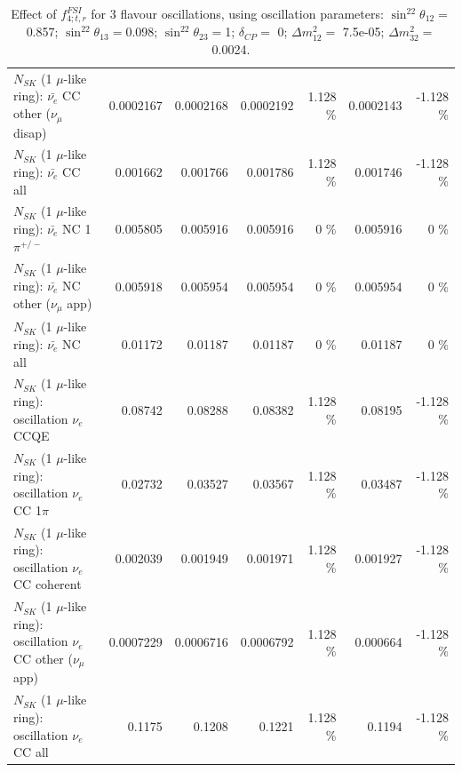 \begin{table}
\begin{tabular}{| l | r | r | r  r | r  r |}
          $N_{SK}$ (1 $\mu$-like ring): $\bar{\nu_e}$ CC other ($\nu_\mu$ disap) &       0.0002167 &       0.0002168 &       0.0002192 &    1.128 \%  &       0.0002143 &   -1.128 \%  \\ 
                            $N_{SK}$ (1 $\mu$-like ring): $\bar{\nu_{e}}$ CC all &        0.001662 &        0.001766 &        0.001786 &    1.128 \%  &        0.001746 &   -1.128 \%  \\ 
\hline
                     $N_{SK}$ (1 $\mu$-like ring): $\bar{\nu_e}$ NC 1$\pi^{+/-}$ &        0.005805 &        0.005916 &        0.005916 &        0 \%  &        0.005916 &        0 \%  \\ 
            $N_{SK}$ (1 $\mu$-like ring): $\bar{\nu_e}$ NC other ($\nu_\mu$ app) &        0.005918 &        0.005954 &        0.005954 &        0 \%  &        0.005954 &        0 \%  \\ 
                            $N_{SK}$ (1 $\mu$-like ring): $\bar{\nu_{e}}$ NC all &         0.01172 &         0.01187 &         0.01187 &        0 \%  &         0.01187 &        0 \%  \\ 
\hline
\hline
\hline
                          $N_{SK}$ (1 $\mu$-like ring): oscillation $\nu_e$ CCQE &         0.08742 &         0.08288 &         0.08382 &    1.128 \%  &         0.08195 &   -1.128 \%  \\ 
                     $N_{SK}$ (1 $\mu$-like ring): oscillation $\nu_e$ CC 1$\pi$ &         0.02732 &         0.03527 &         0.03567 &    1.128 \%  &         0.03487 &   -1.128 \%  \\ 
                   $N_{SK}$ (1 $\mu$-like ring): oscillation $\nu_e$ CC coherent &        0.002039 &        0.001949 &        0.001971 &    1.128 \%  &        0.001927 &   -1.128 \%  \\ 
      $N_{SK}$ (1 $\mu$-like ring): oscillation $\nu_e$ CC other ($\nu_\mu$ app) &       0.0007229 &       0.0006716 &       0.0006792 &    1.128 \%  &        0.000664 &   -1.128 \%  \\ 
                       $N_{SK}$ (1 $\mu$-like ring): oscillation $\nu_e$  CC all &          0.1175 &          0.1208 &          0.1221 &    1.128 \%  &          0.1194 &   -1.128 \%  \\ 
\hline
\hline
\end{tabular}
\caption{ Effect of $f_{4; t, r}^{FSI}$ for 3 flavour oscillations, using oscillation parameters:  $\sin^22\theta_{12} = $0.857; $\sin^22\theta_{13} = $0.098; $\sin^22\theta_{23} = $1; $\delta_{CP} = $        0; $\Delta m^2_{12} = $    7.5e-05; $\Delta m^2_{32} = $    0.0024. }
\label{tab:num_fsi_004_1RmuT_3f_osc_t13:0.098_spectralreco_spectraltrue}
\end{table}
